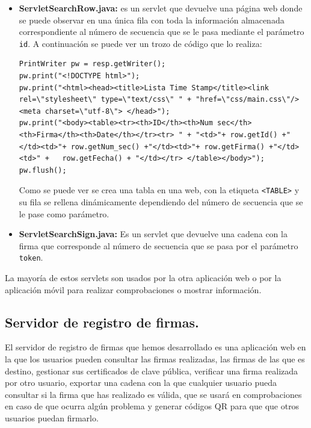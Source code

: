 \begin{itemize}
\item \textbf{ServletSearchRow.java:} es un servlet que devuelve una página web donde se puede observar en una única fila con toda la información almacenada correspondiente al número de secuencia que se le pasa mediante el parámetro \lstinline{id}. A continuación se puede ver un trozo de código que lo realiza:

\begin{lstlisting}[style=Java]
PrintWriter pw = resp.getWriter();
pw.print("<!DOCTYPE html>");
pw.print("<html><head><title>Lista Time Stamp</title><link rel=\"stylesheet\" type=\"text/css\" " + "href=\"css/main.css\"/> <meta charset=\"utf-8\"> </head>");
pw.print("<body><table><tr><th>ID</th><th>Num sec</th><th>Firma</th><th>Date</th></tr><tr> " + "<td>"+ row.getId() +"</td><td>"+ row.getNum_sec() +"</td><td>"+ row.getFirma() +"</td><td>" +	row.getFecha() + "</td></tr> </table></body>");
pw.flush();
\end{lstlisting}

Como se puede ver se crea una tabla en una web, con la etiqueta \lstinline{<TABLE>} y su fila se rellena dinámicamente dependiendo del número de secuencia que se le pase como parámetro.

\item \textbf{ServletSearchSign.java:} Es un servlet que devuelve una cadena con la firma que corresponde al número de secuencia que se pasa por el parámetro \lstinline{token}.

\end{itemize}

La mayoría de estos servlets son usados por la otra aplicación web o por la aplicación móvil para realizar comprobaciones o mostrar información.


\subsection{Servidor de registro de firmas.}

El servidor de registro de firmas que hemos desarrollado es una aplicación web en la que los usuarios pueden consultar las firmas realizadas, las firmas de las que es destino, gestionar sus certificados de clave pública, verificar una firma realizada por otro usuario, exportar una cadena con la que cualquier usuario pueda consultar si la firma que has realizado es válida, que se usará en comprobaciones en caso de que ocurra algún problema y generar códigos QR para que que otros usuarios puedan firmarlo.

